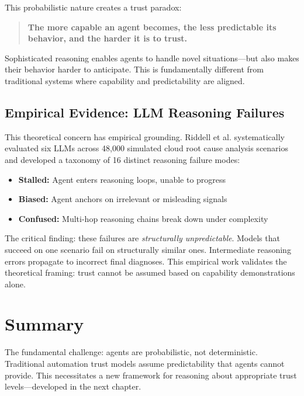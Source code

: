 This probabilistic nature creates a trust paradox:

\begin{quote}
\textbf{The more capable an agent becomes, the less predictable its behavior, and the harder it is to trust.}
\end{quote}

Sophisticated reasoning enables agents to handle novel situations---but also makes their behavior harder to anticipate. This is fundamentally different from traditional systems where capability and predictability are aligned.

\subsection{Empirical Evidence: LLM Reasoning Failures}
\label{subsec:empirical-evidence}

This theoretical concern has empirical grounding. Riddell et al. \citep{riddell2026} systematically evaluated six LLMs across 48,000 simulated cloud root cause analysis scenarios and developed a taxonomy of 16 distinct reasoning failure modes:

\begin{itemize}
    \item \textbf{Stalled:} Agent enters reasoning loops, unable to progress
    \item \textbf{Biased:} Agent anchors on irrelevant or misleading signals
    \item \textbf{Confused:} Multi-hop reasoning chains break down under complexity
\end{itemize}

The critical finding: these failures are \textit{structurally unpredictable}. Models that succeed on one scenario fail on structurally similar ones. Intermediate reasoning errors propagate to incorrect final diagnoses. This empirical work validates the theoretical framing: trust cannot be assumed based on capability demonstrations alone.

\section{Summary}
\label{sec:trust-problem-summary}

The fundamental challenge: agents are probabilistic, not deterministic. Traditional automation trust models assume predictability that agents cannot provide. This necessitates a new framework for reasoning about appropriate trust levels---developed in the next chapter.
